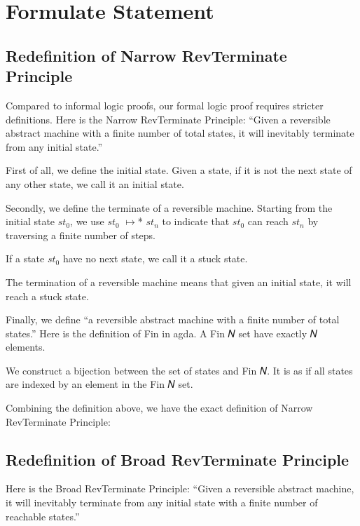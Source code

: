 \section{Formulate Statement}

\subsection{ Redefinition of Narrow RevTerminate Principle}
Compared to informal logic proofs, our formal logic proof requires stricter definitions. 
Here is the Narrow RevTerminate Principle:
``Given a reversible abstract machine with a finite number of total states, it will inevitably terminate from any initial state.''

First of all, we define the initial state.  Given a state, if it is not the next state of any other state, we call it an initial state.


Secondly, we define the terminate of a reversible machine.
Starting from the initial state $st_{0}$, we use $st_{0}$ $\mapsto$* $st_{n}$ to indicate that $st_{0}$ can reach $st_{n}$ by traversing a finite number of steps.


If a state $st_{0}$ have no next state, we call it a stuck state.


The termination of a reversible machine means that given an initial state, it will reach a stuck state.


Finally, we define ``a reversible abstract machine with a finite number of total states.''
Here is the definition of Fin in agda.  A Fin 𝑁 set have exactly 𝑁 elements.


We construct a bijection between the set of states and Fin 𝑁.
It is as if all states are indexed by an element in the Fin 𝑁 set.


Combining the definition above, we have the exact definition of Narrow RevTerminate Principle:


\subsection{ Redefinition of Broad RevTerminate Principle }
Here is the Broad RevTerminate Principle:
``Given a reversible abstract machine, it will inevitably terminate from any initial state with a finite number of reachable states.''

